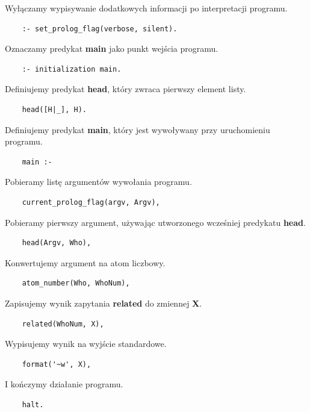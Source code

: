 \documentclass[12pt,a4paper]{article}
\begin{document}
\clearpage
Wyłączamy wypisywanie dodatkowych informacji po interpretacji programu.
\begin{verbatim}
    :- set_prolog_flag(verbose, silent).
\end{verbatim}

Oznaczamy predykat \textbf{main} jako punkt wejścia programu.
\begin{verbatim}
    :- initialization main.
\end{verbatim}

Definiujemy predykat \textbf{head}, który zwraca pierwszy element listy.
\begin{verbatim}
    head([H|_], H).
\end{verbatim}

Definiujemy predykat \textbf{main}, który jest wywoływany przy uruchomieniu programu.
\begin{verbatim}
    main :-
\end{verbatim}

Pobieramy listę argumentów wywołania programu.
\begin{verbatim}
    current_prolog_flag(argv, Argv),
\end{verbatim}

Pobieramy pierwszy argument, używając utworzonego wcześniej predykatu \textbf{head}.
\begin{verbatim}
    head(Argv, Who),
\end{verbatim}

Konwertujemy argument na atom liczbowy.
\begin{verbatim}
    atom_number(Who, WhoNum),
\end{verbatim}

Zapisujemy wynik zapytania \textbf{related} do zmiennej \textbf{X}.
\begin{verbatim}
    related(WhoNum, X),
\end{verbatim}

Wypisujemy wynik na wyjście standardowe.
\begin{verbatim}
    format('~w', X),
\end{verbatim}

I kończymy działanie programu.
\begin{verbatim}
    halt.
\end{verbatim}
\end{document}
